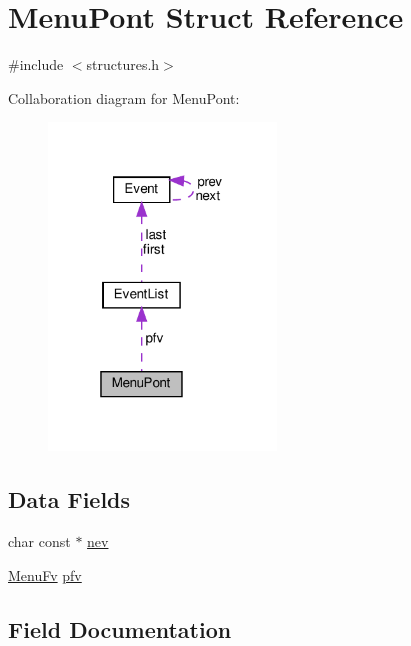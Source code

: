 \hypertarget{struct_menu_pont}{}\section{Menu\+Pont Struct Reference}
\label{struct_menu_pont}


{\ttfamily \#include $<$structures.\+h$>$}



Collaboration diagram for Menu\+Pont\+:\nopagebreak
\begin{figure}[H]
\begin{center}
\leavevmode
\includegraphics[width=172pt]{struct_menu_pont__coll__graph}
\end{center}
\end{figure}
\subsection*{Data Fields}
\begin{DoxyCompactItemize}
\item 
char const  $\ast$ \hyperlink{struct_menu_pont_a21c8b004e3b92cd18b29f8a51717956d}{nev}
\item 
\hyperlink{structures_8h_aa04041873905737ffeb12c611f7c5bde}{Menu\+Fv} \hyperlink{struct_menu_pont_a3b19ca5c366ddc663cb0c6d05ad580ad}{pfv}
\end{DoxyCompactItemize}


\subsection{Field Documentation}
\mbox{\label{struct_menu_pont_a21c8b004e3b92cd18b29f8a51717956d}} 
